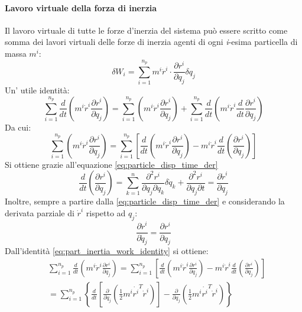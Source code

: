 \paragraph{Lavoro virtuale della forza di inerzia}
Il lavoro virtuale di tutte le forze d'inerzia del sistema può essere scritto come somma dei lavori virtuali delle forze di inerzia agenti di ogni \emph{i}-esima particella di massa $m^i$:
\begin{equation}
\label{eq:inertia_vwork_particle}
\delta W_i = \sum_{i=1}^{n_p}m^i\ddot{r}^i\cdot \frac{\partial r^i}{\partial q_j}\delta q_j 
\end{equation}
Un' utile identità:
\[\sum_{i=1}^{n_p}\frac{d}{dt}\left(m^i\dot{r}^i\frac{\partial r^i}{\partial q_j}\right)
 = \sum_{i=1}^{n_p} \left(m^i\ddot{r}^i\frac{\partial r^i}{\partial q_j}\right) +  \sum_{i=1}^{n_p} \frac{d}{dt} \left(m^i\dot{r}^i\frac{d}{dt}\frac{\partial r^i}{\partial q_j}\right) \]
Da cui:
\begin{equation}
\label{eq:part_inertia_work_identity}
\sum_{i=1}^{n_p}\left(m^i\ddot{r}^i\frac{\partial r^i}{\partial q_j}\right) 
 = \sum_{i=1}^{n_p}\left[ \frac{d}{dt}\left(m^i\dot{r}^i\frac{\partial r^i}{\partial q_j}\right) - m^i\dot{r}^i\frac{d}{dt}\left(\frac{\partial r^i}{\partial q_j}\right) \right]
\end{equation}
Si ottiene grazie all'equazione \ref{eq:particle_disp_time_der}
\begin{equation}
\label{eq:drdot_dq}
\frac{d}{dt}\left(\frac{\partial r^i}{\partial q_j}\right) = \sum_{k=1}^n \frac{\partial ^2 r^i}{\partial q_j\partial q_k}\delta \dot{q}_k + \frac{\partial ^2r^i}{\partial q_j\partial t} = \frac{\partial \dot{r}^i}{\partial q_j}
\end{equation}
Inoltre, sempre a partire dalla \ref{eq:particle_disp_time_der} e considerando la derivata parziale di $\dot{r}^i$ rispetto ad $q_j$:
\begin{equation}
\label{eq:drdot_dqdot}
\frac{\partial\dot{r}^i}{\partial \dot{q}_j} = \frac{\partial r^i}{\partial q_j}
\end{equation}
Dall'identità \ref{eq:part_inertia_work_identity} si ottiene:
\begin{align}
& \sum_{i=1}^{n_p} \frac{d}{dt} \left(m^i\ddot{r}^i\frac{\partial r^i}{\partial q_j}\right) 
 = \sum_{i=1}^{n_p}\left[ \frac{d}{dt}\left(m^i\dot{r}^i\frac{\partial r^i}{\partial q_j}\right) - m^i\dot{r}^i\frac{d}{dt}\left(\frac{\partial r^i}{\partial q_j}\right) \right]  \nonumber \\
&= \sum_{i=1}^{n_p}\left\{\frac{d}{dt}\left[\frac{\partial}{\partial \dot{q}_j}\left(\frac{1}{2}m^i\dot{r^i}^T\dot{r}^i\right)\right] -\frac{\partial}{\partial q_j}\left(\frac{1}{2}m^i\dot{r^i}^T\dot{r}^i\right)\right\}
\end{align}
